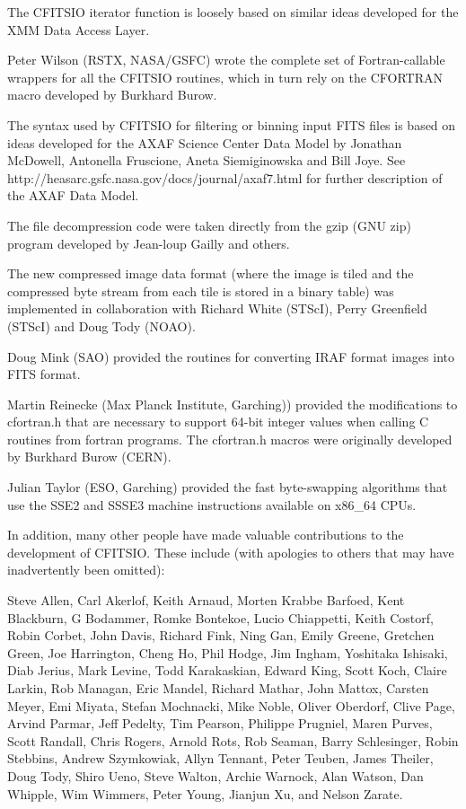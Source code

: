 \documentclass[11pt]{book}
\begin{document}
The CFITSIO iterator function is loosely based on similar ideas
developed for the XMM Data Access Layer.

Peter Wilson (RSTX, NASA/GSFC) wrote the complete set of
Fortran-callable wrappers for all the CFITSIO routines, which in turn
rely on the CFORTRAN macro developed by Burkhard Burow.

The syntax used by CFITSIO for filtering or binning input FITS files is
based on ideas developed for the AXAF Science Center Data Model by
Jonathan McDowell, Antonella Fruscione, Aneta Siemiginowska and Bill
Joye. See http://heasarc.gsfc.nasa.gov/docs/journal/axaf7.html for
further description of the AXAF Data Model.

The file decompression code were taken directly from the gzip (GNU zip)
program developed by Jean-loup Gailly and others.

The new compressed image data format (where the image is tiled and
the compressed byte stream from each tile is stored in a binary table)
was implemented in collaboration with Richard White (STScI), Perry
Greenfield (STScI) and Doug Tody (NOAO).

Doug Mink (SAO) provided the routines for converting IRAF format
images into FITS format.

Martin Reinecke (Max Planck Institute, Garching)) provided the modifications to
cfortran.h that are necessary to support 64-bit integer values when calling
C routines from fortran programs.  The cfortran.h macros were originally developed
by Burkhard Burow (CERN).

Julian Taylor (ESO, Garching) provided the fast byte-swapping algorithms
that use the SSE2 and SSSE3 machine instructions available on x86\_64 CPUs.

In addition, many other people have made valuable contributions to the
development of CFITSIO.  These include (with apologies to others that may
have inadvertently been omitted):

Steve Allen, Carl Akerlof, Keith Arnaud, Morten Krabbe Barfoed, Kent
Blackburn, G Bodammer, Romke Bontekoe, Lucio Chiappetti, Keith Costorf,
Robin Corbet, John Davis,  Richard Fink, Ning Gan, Emily Greene, Gretchen
Green, Joe Harrington, Cheng Ho, Phil Hodge, Jim Ingham, Yoshitaka
Ishisaki, Diab Jerius, Mark Levine, Todd Karakaskian, Edward King,
Scott Koch,  Claire Larkin, Rob Managan, Eric Mandel, Richard Mathar,
John Mattox, Carsten Meyer, Emi Miyata, Stefan Mochnacki, Mike Noble,
Oliver Oberdorf, Clive Page, Arvind Parmar, Jeff Pedelty, Tim Pearson,
Philippe Prugniel, Maren Purves, Scott Randall, Chris Rogers, Arnold Rots,
Rob Seaman, Barry Schlesinger, Robin Stebbins, Andrew Szymkowiak, Allyn Tennant,
Peter Teuben, James Theiler, Doug Tody, Shiro Ueno, Steve Walton, Archie
Warnock, Alan Watson, Dan Whipple, Wim Wimmers, Peter Young, Jianjun Xu,
and Nelson Zarate.
\end{document}
